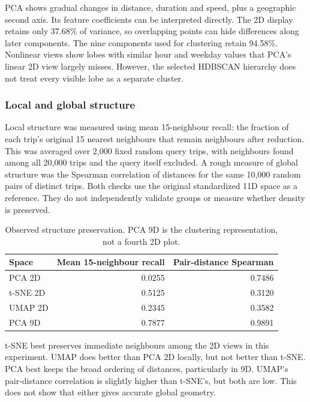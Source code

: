 \documentclass{article}
\begin{document}
PCA shows gradual changes in distance, duration and speed, plus a geographic
second axis. Its feature coefficients can be interpreted directly.
The 2D display retains only 37.68\% of variance, so overlapping points can
hide differences along later components. The nine components used for
clustering retain 94.58\%. Nonlinear views show lobes with similar hour and
weekday values that PCA's linear 2D view largely misses. However, the
selected HDBSCAN hierarchy does not treat every visible lobe as a separate cluster.

\subsubsection{Local and global structure}

Local structure was measured using mean 15-neighbour recall: the fraction
of each trip's original 15 nearest neighbours that remain neighbours after
reduction. This was averaged over 2,000 fixed random query trips, with
neighbours found among all 20,000 trips and the query itself excluded.
A rough measure of global structure was the Spearman correlation of distances
for the same 10,000 random pairs of distinct trips. Both checks use the
original standardized 11D space as a reference. They do not independently
validate groups or measure whether density is preserved.

\begin{table}[H]
  \caption{Observed structure preservation. PCA 9D is the clustering
  representation, not a fourth 2D plot.}
  \centering
  \begin{tabular}{lrr}
    \toprule
    Space & Mean 15-neighbour recall & Pair-distance Spearman \\
    \midrule
    PCA 2D & 0.0255 & 0.7486 \\
    t-SNE 2D & 0.5125 & 0.3120 \\
    UMAP 2D & 0.2345 & 0.3582 \\
    PCA 9D & 0.7877 & 0.9891 \\
    \bottomrule
  \end{tabular}
\end{table}

t-SNE best preserves immediate neighbours among the 2D views in this
experiment. UMAP does better than PCA 2D locally, but not better than t-SNE.
PCA best keeps the broad ordering of distances, particularly in 9D.
UMAP's pair-distance correlation is slightly higher than t-SNE's, but both
are low. This does not show that either gives accurate global geometry.
\end{document}
